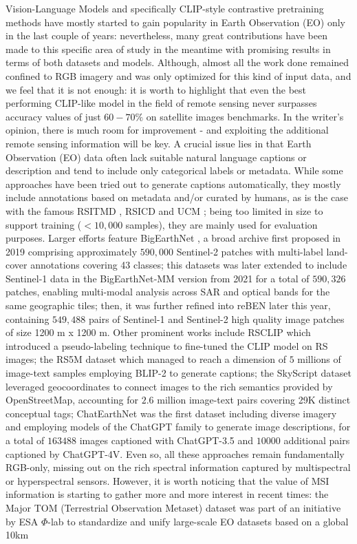 \documentclass[a4paper, oneside, english]{sapthesis} %
\begin{document}
Vision-Language Models and specifically CLIP-style contrastive pretraining methods have mostly started to gain popularity in Earth Observation (EO) only in the last couple of years: nevertheless, many great contributions have been made to this specific area of study in the meantime with promising results in terms of both datasets and models. Although, almost all the work done remained confined to RGB imagery and was only optimized for this kind of input data, and we feel that it is not enough: it is worth to highlight that even the best performing CLIP-like model in the field of remote sensing never surpasses accuracy values of just $60-70\%$ on satellite images benchmarks. In the writer's opinion, there is much room for improvement - and exploiting the additional remote sensing information will be key. A crucial issue lies in that Earth Observation (EO) data often lack suitable natural language captions or description and tend to include only categorical labels or metadata. While some approaches have been tried out to generate captions automatically, they mostly include annotations based on metadata and/or curated by humans, as is the case with the famous RSITMD \cite{yuan2022exploring}, RSICD \cite{lu2017exploring} and UCM \cite{yang2010bag}; being too limited in size to support training ($< 10,000$ samples), they are mainly used for evaluation purposes. Larger efforts feature BigEarthNet \cite{sumbul2019bigearthnet}, a broad archive first proposed in 2019 comprising approximately $590,000$ Sentinel‑2 patches with multi-label land-cover annotations covering 43 classes; this datasets was later extended to include Sentinel‑1 data in the BigEarthNet‑MM version from 2021 \cite{sumbul2021bignearthnetmm} for a total of $590,326$ patches, enabling multi-modal analysis across SAR and optical bands for the same geographic tiles; then, it was further refined into reBEN \cite{clasen2024reben} later this year, containing $549,488$ pairs of Sentinel-1 and Sentinel-2 high quality image patches of size 1200 m x 1200 m. Other prominent works include RSCLIP \cite{li2023rs} which introduced a pseudo-labeling technique to fine-tuned the CLIP model on RS images; the RS5M dataset \cite{zhang2024rs5m} which managed to reach a dimension of $5$ millions of image-text samples employing BLIP-2 \cite{li2023blip} to generate captions; the SkyScript dataset \cite{wang2024skyscript} leveraged geocoordinates to connect images to the rich semantics provided by OpenStreetMap, accounting for $2.6$ million image-text pairs covering 29K distinct conceptual tags; ChatEarthNet \cite{yuan2024chatearthnet} was the first dataset including diverse imagery and employing models of the ChatGPT family to generate image descriptions, for a total of $163488$ images captioned with ChatGPT-3.5 and $10000$ additional pairs captioned by ChatGPT-4V. Even so, all these approaches remain fundamentally RGB-only, missing out on the rich spectral information captured by multispectral or hyperspectral sensors. However, it is worth noticing that the value of MSI information is starting to gather more and more interest in recent times: the Major TOM (Terrestrial Observation Metaset) dataset \cite{francis2024major} was part of an initiative by ESA $\Phi$-lab to standardize and unify large-scale EO datasets based on a global 10km 
\end{document}
